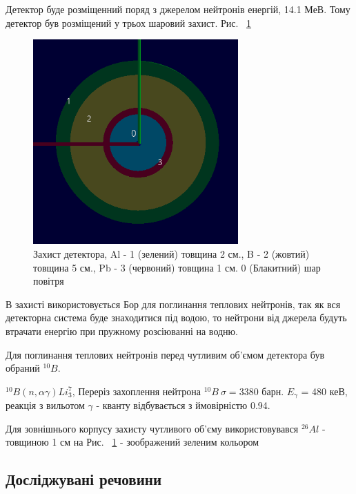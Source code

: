 \documentclass[a4paper, 14pt]{article}
\numberwithin{equation}{section}
\numberwithin{table}{section}
\begin{document}
Детектор буде розміщенний поряд з джерелом нейтронів енергій, 14.1 МеВ. Тому детектор був розміщений у трьох шаровий захист. Рис. ~\ref{ris:s_detector_P}	
\begin{figure}[hbt!]
	\centering \includegraphics[width=0.7\textwidth]{images/dectorPrt.png}
	\caption{Захист детектора, Al - 1 (зелений) товщина 2 см., B - 2 (жовтий) товщина 5 см., Pb - 3 (червоний) товщина 1 см. 0 (Блакитний) шар повітря} 
	\label{ris:s_detector_P}	
\end{figure} 
В захисті використовується Бор для поглинання теплових нейтронів, так як вся детекторна система буде знаходитися під водою, то нейтрони від джерела будуть втрачати енергію при пружному розсіюванні на водню. 

Для поглинання теплових нейтронів перед чутливим об'ємом детектора був обраний $^{10}B$.  

$^{10}B ( n, \alpha \gamma)Li_3^7$, Переріз захоплення нейтрона $^{10}B \ \sigma = 3380$ барн.
$E_\gamma$ = 480 кеВ, реакція з вильотом $\gamma$ - кванту відбувається з ймовірністю 0.94.

Для зовнішнього корпусу захисту чутливого об'єму використовувався $^{26}Al$ - товщиною 1 см на Рис. ~\ref{ris:s_detector_P} - зоображений зеленим кольором 

\subsection{Досліджувані речовини} 
\end{document}
